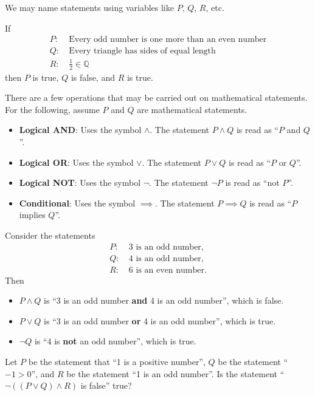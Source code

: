 We may name statements using variables like $P$, $Q$, $R$, etc.
\begin{example}
    If
    \begin{align*}
        P: &\ \text{Every odd number is one more than an even number}\\
        Q: &\ \text{Every triangle has sides of equal length}\\
        R: &\ \frac12 \in \mathbb{Q}
    \end{align*}
    then $P$ is true, $Q$ is false, and $R$ is true.
\end{example}

There are a few operations that may be carried out on mathematical statements. For the following, assume $P$ and $Q$ are mathematical statements.
\begin{itemize}
    \item \textbf{Logical AND}: Uses the symbol $\land$. The statement $P\land Q$ is read as ``$P$ and $Q$''.
    \item \textbf{Logical OR}: Uses the symbol $\lor$. The statement $P\lor Q$ is read as ``$P$ or $Q$''.
    \item \textbf{Logical NOT}: Uses the symbol $\lnot$. The statement $\lnot P$ is read as ``not $P$''.
    \item \textbf{Conditional}: Uses the symbol $\implies$. The statement $P \implies Q$ is read as ``$P$ implies $Q$''.  
\end{itemize}
\begin{example}
    Consider the statements
    \begin{align*}
        P: &\ \text{3 is an odd number,}\\
        Q: &\ \text{4 is an odd number,}\\
        R: &\ \text{6 is an even number.}
    \end{align*}
    Then
    \begin{itemize}
        \item $P\land Q$ is ``3 is an odd number \textbf{and} 4 is an odd number'', which is false.
        \item $P\lor Q$ is ``3 is an odd number \textbf{or} 4 is an odd number'', which is true.
        \item $\lnot Q$ is ``4 is \textbf{not} an odd number'', which is true.
    \end{itemize}
\end{example}
\begin{exercise}
    Let $P$ be the statement that ``1 is a positive number'', $Q$ be the statement ``$-1 > 0$'', and $R$ be the statement ``1 is an odd number''. Is the statement ``$\lnot((P\lor Q)\land R)$ is false'' true?
\end{exercise}

